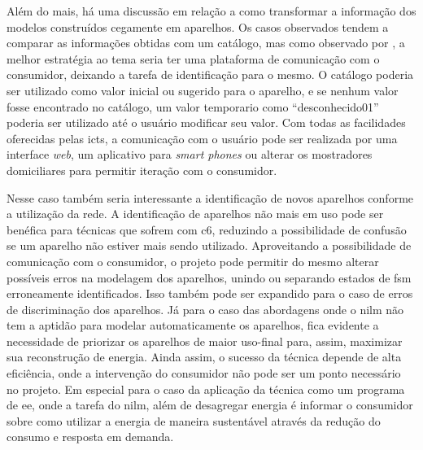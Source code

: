 Além do mais, há uma discussão em relação a como transformar a
informação dos modelos construídos cegamente em aparelhos. Os casos
observados \cite{nilm_hart_1992_8,nilm_bergman_distribuido_2011,
nilm_zeifman_vastext_approach_2012} tendem a comparar as informações
obtidas com um catálogo, mas como observado por
\cite{nilm_matthews_overview_2008_22}, a melhor estratégia ao tema
seria ter uma plataforma de comunicação com o consumidor, deixando a
tarefa de identificação para o mesmo. O catálogo poderia ser utilizado
como valor inicial ou sugerido para o aparelho, e se nenhum valor
fosse encontrado no catálogo, um valor temporario como
``desconhecido01'' poderia ser utilizado até o usuário modificar seu
valor. Com todas as facilidades oferecidas pelas \glspl{ict}, a
comunicação com o usuário pode ser realizada por uma interface
\emph{web}, um aplicativo para \emph{smart phones} ou alterar os
mostradores domiciliares para permitir iteração com o consumidor.

Nesse caso também seria interessante a identificação de novos
aparelhos conforme a utilização da rede. A identificação de aparelhos
não mais em uso pode ser benéfica para técnicas que sofrem com 
\gls{c6}, reduzindo a possibilidade de confusão se um aparelho não
estiver mais sendo utilizado. Aproveitando a possibilidade de
comunicação com o consumidor, o projeto pode permitir do mesmo
alterar possíveis erros na modelagem dos aparelhos, unindo ou
separando estados de \gls{fsm} erroneamente identificados. Isso também
pode ser expandido para o caso de erros de discriminação dos
aparelhos. Já para o caso das abordagens onde o \gls{nilm} não tem a
aptidão para modelar automaticamente os aparelhos, fica evidente a
necessidade de priorizar os aparelhos de maior uso-final para, assim,
maximizar sua reconstrução de energia. Ainda assim, o sucesso da
técnica depende de alta eficiência, onde a intervenção do consumidor
não pode ser um ponto necessário no projeto. Em especial para o caso
da aplicação da técnica como um programa de \gls{ee}, onde a tarefa do
\gls{nilm}, além de desagregar energia é informar o consumidor sobre
como utilizar a energia de maneira sustentável através da redução do
consumo e resposta em demanda.


